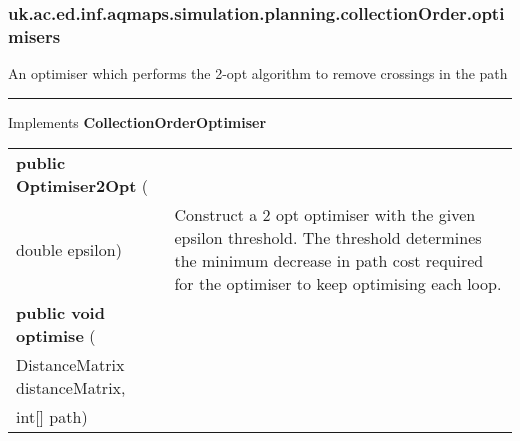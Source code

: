 \subsubsection{ uk.ac.ed.inf.aqmaps.simulation.planning.collectionOrder.optimisers }
 { An optimiser which performs the 2{-}opt algorithm to remove crossings in the path
 
\vspace*{4pt} \hrule \vspace*{3pt}
Implements \textbf{ CollectionOrderOptimiser }
\begin{tabular}{ p{3in}|m{3.4in}}
\textbf{public Optimiser2Opt } (\\ \hspace*{ 5pt} double epsilon) & Construct a 2 opt optimiser with the given epsilon threshold. The threshold determines the minimum decrease in path cost required for the optimiser to keep optimising each loop.\\ \hline 
\textbf{public void optimise } (\\ \hspace*{ 5pt} DistanceMatrix distanceMatrix,\\\hspace*{ 5pt} int{[}{]} path) & \\ \hline 
\end{tabular}
}

